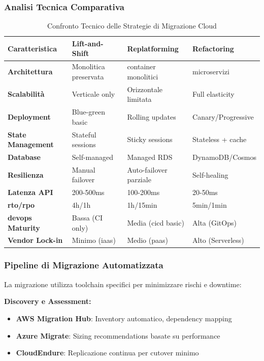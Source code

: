 \subsubsection{\texorpdfstring{\textbf{Analisi Tecnica Comparativa}}{3.4.1.2 - Analisi Tecnica Comparativa}}

\begin{table}[htbp]
\centering
\caption{Confronto Tecnico delle Strategie di Migrazione Cloud}
\label{tab:cloud_migration_technical}
\begin{tabular}{p{3cm}p{3.5cm}p{3.5cm}p{3.5cm}}
\toprule
\textbf{Caratteristica} & \textbf{Lift-and-Shift} & \textbf{Replatforming} & \textbf{Refactoring} \\
\midrule
\textbf{Architettura} & Monolitica preservata & \gls{container} monolitici & \gls{microservizi} \\
\textbf{Scalabilità} & Verticale only & Orizzontale limitata & Full elasticity \\
\textbf{Deployment} & Blue-green basic & Rolling updates & Canary/Progressive \\
\textbf{State Management} & Stateful sessions & Sticky sessions & Stateless + cache \\
\textbf{Database} & Self-managed & Managed RDS & DynamoDB/Cosmos \\
\textbf{Resilienza} & Manual failover & Auto-failover parziale & Self-healing \\
\textbf{Latenza API} & 200-500ms & 100-200ms & 20-50ms \\
\textbf{\gls{rto}/\gls{rpo}} & 4h/1h & 1h/15min & 5min/1min \\
\textbf{\gls{devops} Maturity} & Bassa (CI only) & Media (\gls{cicd} basic) & Alta (GitOps) \\
\textbf{Vendor Lock-in} & Minimo (\gls{iaas}) & Medio (\gls{paas}) & Alto (Serverless) \\
\bottomrule
\end{tabular}
\end{table}

\subsubsection{\texorpdfstring{\textbf{Pipeline di Migrazione Automatizzata}}{3.4.1.3 - Pipeline di Migrazione Automatizzata}}

La migrazione utilizza toolchain specifici per minimizzare rischi e downtime:

\textbf{Discovery e Assessment:}
\begin{itemize}
    \item \textbf{AWS Migration Hub}: Inventory automatico, dependency mapping
    \item \textbf{Azure Migrate}: Sizing recommendations basate su performance
    \item \textbf{CloudEndure}: Replicazione continua per cutover minimo
\end{itemize}


